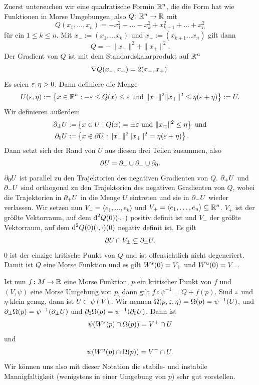 \begin{definition}
    \label{def: notation morse umgebung}
    Zuerst untersuchen wir eine quadratische Formin ${ \mathbb R }^n$, die die Form hat wie Funktionen in Morse
    Umgebungen, also $Q \colon { \mathbb R }^n \to { \mathbb R }$ mit
    \[ Q(x_1, \dots, x_n) = - x_1^2 - \dots - x_k^2 + x_{k + 1}^2 + \dots + x_n^2 \]
    für ein $1 \leq k \leq n$.
    Mit $x_- := (x_1, \dots x_k)$ und $x_+ := (x_{k + 1} \dots x_n)$ gilt dann
    \[ Q = - \| x_- \|^2 + \| x_+ \|^2 . \]
    Der Gradient von $Q$ ist mit dem Standardskalarprodukt auf ${ \mathbb R }^n$
    \[ { \nabla } Q (x_-, x_+) = 2(x_-, x_+) . \]
    Es seien $\varepsilon, \eta > 0$. Dann definiere die Menge
    \[ U(\varepsilon, \eta) := \left\{ x \in { \mathbb R }^n : - \varepsilon \leq Q(x) \leq \varepsilon 
    \text{ und } \| x_- \|^2 \| x_+ \|^2 \leq \eta(\varepsilon + \eta) \right\} := U . \]
    Wir definieren außerdem
    \begin{align*}
        { \partial }_{\pm} U := & \left\{ x \in U: Q(x) = \pm \varepsilon \text{ und } \|x_{\mp} \|^2 \leq \eta \right\} 
            \text{ und} \\
        { \partial }_0 U := & \left\{ x \in { \partial } U: \| x_- \|^2 \| x_+ \|^2 = \eta(\varepsilon + \eta) \right\} .
    \end{align*}
    Dann setzt sich der Rand von $U$ aus diesen drei Teilen zusammen, also
    \[ { \partial } U = { \partial }_+ \cup { \partial }_- \cup { \partial }_0 . \]
    ${ \partial }_0 U$ ist parallel zu den Trajektorien des negativen Gradienten von $Q$. ${ \partial }_+ U$ und 
    ${ \partial }_- U$ sind orthogonal zu den Trajektorien des negativen Gradienten von $Q$, wobei die 
    Trajektorien in ${ \partial }_+ U$ in die Menge $U$ eintreten und sie in ${ \partial }_- U$ wieder verlassen. 
    Wir setzen nun $V_- = \langle e_1, \dots, e_k \rangle$ und 
    $V_+ = \langle e_1, \dots, e_n \rangle \subseteq { \mathbb R }^n$. $V_+$ ist der größte Vektorraum, 
    auf dem ${ \operatorname{d} }^2 Q (0) (\cdot, \cdot)$ positiv definit ist und $V_-$ der größte Vektorraum, auf dem 
    ${ \operatorname{d} }^2 Q (0) (\cdot, \cdot) (0)$ negativ definit ist. 
    Es gilt 
    \[ { \partial } U \cap V_{\pm} \subseteq { \partial }_{\pm} U . \]
    $0$ ist der einzige kritische Punkt von $Q$ und ist offensichtlich nicht degeneriert. Damit ist $Q$
    eine Morse Funktion und es gilt 
    ${ W^s } (0) = V_+$ und ${ W^u } (0) = V_-$.

    Ist nun $f \colon M \to { \mathbb R }$ eine Morse Funktion, $p$ ein kritischer Punkt von $f$ und $(V, \psi)$
    eine Morse Umgebung von $p$, dann gilt $f \circ \psi^{-1} = Q + f(p)$. Sind $\varepsilon$ und $\eta$
    klein genug, dann ist $U \subset \psi(V)$. Wir nennen 
    $\Omega (p, \varepsilon, \eta) = \Omega (p) = \psi^{-1}(U)$, und 
    ${ \partial }_{\pm} \Omega (p) = \psi^{-1}({ \partial }_{\pm}U)$ und ${ \partial }_0 \Omega (p) = \psi^{-1} ({ \partial }_0 U)$.
    Dann ist 
    \[ \psi({ W^s } (p) \cap \Omega (p)) = V^+ \cap U \] 
    und 
    \[ \psi({ W^u } (p) \cap \Omega (p)) = V^- \cap U . \]
    Wir können uns also mit dieser Notation die stabile- und instabile Mannigfaltigkeit (wenigstens 
    in einer Umgebung von $p$) sehr gut vorstellen.


\end{definition}
